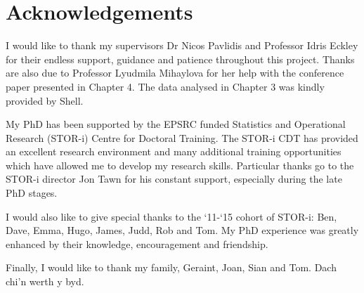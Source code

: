 %							

%								

\chapter*{Acknowledgements}

I would like to thank my supervisors Dr Nicos Pavlidis and Professor Idris Eckley for their endless support, guidance and patience throughout this project. Thanks are also due to Professor Lyudmila Mihaylova for her help with the conference paper presented in Chapter 4. The data analysed in Chapter 3 was kindly provided by Shell.

My PhD has been supported by the EPSRC funded Statistics and Operational Research (STOR-i) Centre for Doctoral Training. The STOR-i CDT has provided an excellent research environment and many additional training opportunities which have allowed me to develop my research skills.  Particular thanks go to the STOR-i director Jon Tawn for his constant support, especially during the late PhD stages. 

I would also like to give special thanks  to the `11-`15 cohort of STOR-i: Ben, Dave, Emma, Hugo, James, Judd, Rob and Tom. My PhD experience was greatly enhanced by their knowledge, encouragement and friendship.  

Finally, I would like to thank my family, Geraint, Joan, Sian and Tom. Dach chi'n werth y byd. 

